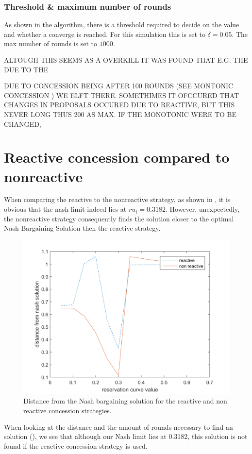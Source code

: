 
\subsubsection{Threshold \& maximum number of rounds}
As shown in the algorithm, there is a threshold required to decide on the value and whether a converge is reached. For this simulation this is set to $\delta = 0.05$.	The max number of rounds is set to $1000$.

ALTOUGH THIS SEEMS AS A OVERKILL IT WAS FOUND THAT E.G. THE DUE TO THE 

DUE TO CONCESSION BEING AFTER 100 ROUNDS (SEE MONTONIC CONCESSION ) WE ELFT THERE. SOMETHIMES IT OFCCURED THAT CHANGES IN PROPOSALS OCCURED DUE TO REACTIVE, BUT THIS NEVER LONG THUS 200 AS MAX. IF THE MONOTONIC WERE TO BE CHANGED, 
\section{Reactive concession compared to nonreactive}
When comparing the reactive to the nonreactive strategy, as shown in , it is obvious that the nash limit indeed lies at $ru_i = 0.3182$. However, unexpectedly, the nonreactive strategy consequently finds the solution closer to the optimal Nash Bargaining Solution then the reactive strategy. 

\begin{figure}[h]
	\centering
	\includegraphics[width=0.7\linewidth]{img/reactivevsnonreactive}
	\caption{Distance from the Nash bargaining solution for the reactive and non reactive concession strategies. }
	\label{fig:reactivevsnonreactive}
\end{figure}

When looking at the distance and the amount of rounds necessary to find an solution (), we see that although our Nash limit lies at 0.3182, this solution is not found if the reactive concession strategy is used. 


